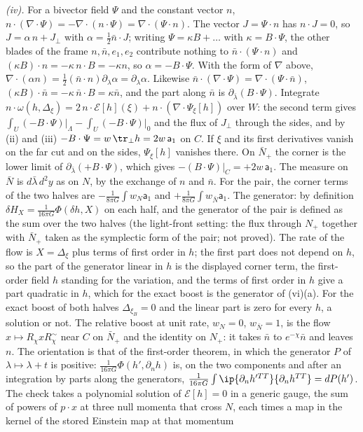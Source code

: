 \emph{(iv).} For a bivector field $\Psi$ and the constant vector $n$, $n \cdot (\nabla \cdot \Psi) = -\nabla \cdot (n \cdot \Psi) = \nabla \cdot (\Psi \cdot n)$. The vector $J = \Psi \cdot n$ has $n \cdot J = 0$, so $J = \alpha\,n + J_{\perp}$ with $\alpha = \tfrac12\bar n \cdot J$; writing $\Psi = \kappa B + \dots$ with $\kappa = B \cdot \Psi$, the other blades of the frame $n, \bar n, e_{1}, e_{2}$ contribute nothing to $\bar n \cdot (\Psi \cdot n)$ and $(\kappa B) \cdot n = -\kappa\,n \cdot B = -\kappa n$, so $\alpha = -B \cdot \Psi$. With the form of $\nabla$ above, $\nabla \cdot (\alpha n) = \tfrac12(\bar n \cdot n)\partial_{\lambda}\alpha = \partial_{\lambda}\alpha$. Likewise $\bar n \cdot (\nabla \cdot \Psi) = \nabla \cdot (\Psi \cdot \bar n)$, $(\kappa B) \cdot \bar n = -\kappa\,\bar n \cdot B = \kappa\bar n$, and the part along $\bar n$ is $\partial_{\bar\lambda}(B \cdot \Psi)$. Integrate $n \cdot \omega(h, \Delta_{\xi}) = 2\,n \cdot \mathcal{E}[h](\xi) + n \cdot (\nabla \cdot \Psi_{\xi}[h])$ over $W$: the second term gives $\int_{U}(-B \cdot \Psi)\big|_{\Lambda} - \int_{U}(-B \cdot \Psi)\big|_{0}$ and the flux of $J_{\perp}$ through the sides, and by (ii) and (iii) $-B \cdot \Psi = w\,\tr_{\perp}h = 2w\,\mathsf{a}_{1}$ on $C$. If $\xi$ and its first derivatives vanish on the far cut and on the sides, $\Psi_{\xi}[h]$ vanishes there. On $\bar N_{+}$ the corner is the lower limit of $\partial_{\bar\lambda}(+B \cdot \Psi)$, which gives $-(B \cdot \Psi)\big|_{C} = +2w\,\mathsf{a}_{1}$. The measure on $\bar N$ is $d\bar\lambda\,d^{2}y$ as on $N$, by the exchange of $n$ and $\bar n$. For the pair, the corner terms of the two halves are $-\tfrac{1}{8\pi G}\int w_{N}\mathsf{a}_{1}$ and $+\tfrac{1}{8\pi G}\int w_{\bar N}\mathsf{a}_{1}$. The generator: by definition $\delta H_{X} = \tfrac{1}{16\pi G}\Phi(\delta h, X)$ on each half, and the generator of the pair is defined as the sum over the two halves (the light-front setting: the flux through $N_{+}$ together with $\bar N_{+}$ taken as the symplectic form of the pair; not proved). The rate of the flow is $X = \Delta_{\xi}$ plus terms of first order in $h$; the first part does not depend on $h$, so the part of the generator linear in $h$ is the displayed corner term, the first-order field $h$ standing for the variation, and the terms of first order in $h$ give a part quadratic in $h$, which for the exact boost is the generator of (vi)(a). For the exact boost of both halves $\Delta_{\xi_{B}} = 0$ and the linear part is zero for every $h$, a solution or not. The relative boost at unit rate, $w_{N} = 0$, $w_{\bar N} = 1$, is the flow $x \mapsto R_{\chi}xR_{\chi}^{\sim}$ near $C$ on $\bar N_{+}$ and the identity on $N_{+}$: it takes $\bar n$ to $e^{-\chi}\bar n$ and leaves $n$. The orientation is that of the first-order theorem, in which the generator $P$ of $\lambda \mapsto \lambda + t$ is positive: $\tfrac{1}{16\pi G}\Phi(h', \partial_{n}h)$ is, on the two components and after an integration by parts along the generators, $\tfrac{1}{16\pi G}\int\ip{\partial_{n}h'^{TT}}{\partial_{n}h^{TT}} = dP(h')$. The check takes a polynomial solution of $\mathcal{E}[h] = 0$ in a generic gauge, the sum of powers of $p \cdot x$ at three null momenta that cross $N$, each times a map in the kernel of the stored Einstein map at that momentum 